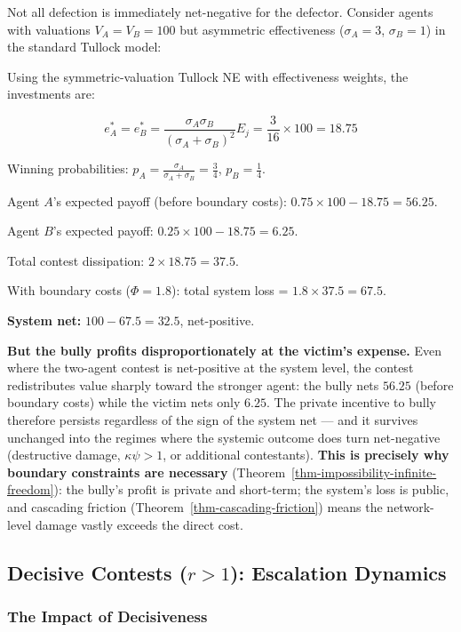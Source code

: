 \documentclass[11pt]{article}
\theoremstyle{plain}
\theoremstyle{definition}
\theoremstyle{remark}
\let\origsubsection\subsection
\renewcommand{\subsection}{\needspace{7\baselineskip}\origsubsection}
\let\origsubsubsection\subsubsection
\renewcommand{\subsubsection}{\needspace{4\baselineskip}\origsubsubsection}
\begin{document}
Not all defection is immediately net-negative for the defector. Consider
agents with valuations \(V_A = V_B = 100\) but asymmetric effectiveness
(\(\sigma_A = 3\), \(\sigma_B = 1\)) in the standard Tullock model:

Using the symmetric-valuation Tullock NE with effectiveness weights, the
investments are:

\[e_A^* = e_B^* = \frac{\sigma_A \sigma_B}{(\sigma_A + \sigma_B)^2} E_j = \frac{3}{16} \times 100 = 18.75\]

Winning probabilities:
\(p_A = \frac{\sigma_A}{\sigma_A + \sigma_B} = \frac{3}{4}\),
\(p_B = \frac{1}{4}\).

Agent \(A\)'s expected payoff (before boundary costs):
\(0.75 \times 100 - 18.75 = 56.25\).

Agent \(B\)'s expected payoff: \(0.25 \times 100 - 18.75 = 6.25\).

Total contest dissipation: \(2 \times 18.75 = 37.5\).

With boundary costs (\(\Phi = 1.8\)): total system loss =
\(1.8 \times 37.5 = 67.5\).

\textbf{System net:} \(100 - 67.5 = 32.5\), net-positive.

\textbf{But the bully profits disproportionately at the victim's
expense.} Even where the two-agent contest is net-positive at the system
level, the contest redistributes value sharply toward the stronger
agent: the bully nets \(56.25\) (before boundary costs) while the victim
nets only \(6.25\). The private incentive to bully therefore persists
regardless of the sign of the system net --- and it survives unchanged
into the regimes where the systemic outcome does turn net-negative
(destructive damage, \(\kappa\psi > 1\), or additional contestants).
\textbf{This is precisely why boundary constraints are necessary}
(Theorem~\ref{thm-impossibility-infinite-freedom}): the bully's profit
is private and short-term; the system's loss is public, and cascading
friction (Theorem~\ref{thm-cascading-friction}) means the network-level
damage vastly exceeds the direct cost.

\subsection{\texorpdfstring{Decisive Contests (\(r > 1\)): Escalation
Dynamics}{Decisive Contests (r \textgreater{} 1): Escalation Dynamics}}\label{decisive-contests-escalation-dynamics}

\subsubsection{The Impact of
Decisiveness}\label{the-impact-of-decisiveness}
\end{document}
